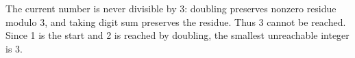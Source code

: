 The current number is never divisible by 3: doubling preserves nonzero residue modulo 3, and taking digit sum preserves the residue. Thus 3 cannot be reached. Since 1 is the start and 2 is reached by doubling, the smallest unreachable integer is $\boxed3$.
